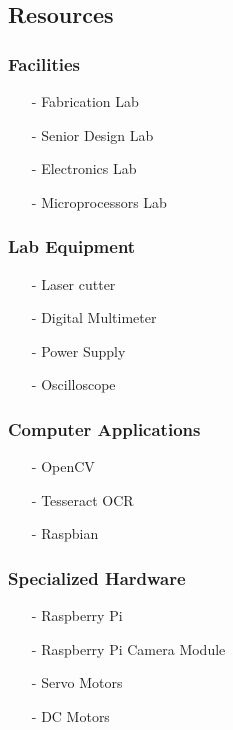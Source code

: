 \documentclass[12pt]{article}
\begin{document}
\subsection{Resources}

\subsubsection{Facilities}

\begin{itemize}[nolistsep, noitemsep]
	\item[-] Fabrication Lab
	\item[-] Senior Design Lab
	\item[-] Electronics Lab
	\item[-] Microprocessors Lab
\end{itemize}

\subsubsection{Lab Equipment}

\begin{itemize}[noitemsep]
	\item[-] Laser cutter
	\item[-] Digital Multimeter
	\item[-] Power Supply
	\item[-] Oscilloscope
\end{itemize}

\subsubsection{Computer Applications}

\begin{itemize}[noitemsep]
	\item[-] OpenCV
	\item[-] Tesseract OCR
	\item[-] Raspbian
\end{itemize}

\subsubsection{Specialized Hardware}

\begin{itemize}[noitemsep]
	\item[-] Raspberry Pi
	\item[-] Raspberry Pi Camera Module
	\item[-] Servo Motors
	\item[-] DC Motors
\end{itemize}
\end{document}
